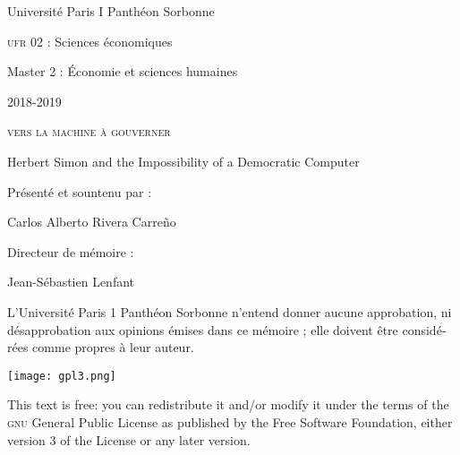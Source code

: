\documentclass[version=last,draft=false,paper=A4,portrait,twoside=true,twocolumn=false,headinclude=false,footinclude=false,fontsize=11,BCOR=15mm,DIV=calc,pagesize=auto,titlepage=firstiscover,mpinclude=true,open=right,chapterprefix=true,numbers=autoendperiod,headsepline=false,parskip=false]{scrreprt}
\author{Carlos Alberto Rivera Carreño}
\date{}
\title{}
\begin{document}
\begin{titlepage}
 \centering
\begin{french}
 {\large Université Paris I Panthéon Sorbonne \par}
 \vspace{0.5\baselineskip}
 {\large \textsc{ufr} 02 : Sciences économiques  \par}
 \vspace{0.5\baselineskip}
 {\large Master 2 : Économie et sciences humaines \par}
 \vspace{0.5\baselineskip}
 {\large 2018-2019 \par}
\end{french}
 \vspace{6\baselineskip}
 {\huge\sffamily \textsc{vers la machine à gouverner}  \par}
 {\Large\sffamily Herbert Simon and the Impossibility of a Democratic Computer \par}
\vfill
\begin{french}
 {\large Présenté et sountenu par : \par}
\end{french}
 {\large Carlos Alberto Rivera Carreño \par}
 \vspace{1\baselineskip}
\begin{french}
 {\large Directeur de mémoire : \par}
\end{french}
 {\large Jean-Sébastien Lenfant \par}
\end{titlepage}

\pagestyle{empty}

\begin{french}
L'Université Paris 1 Panthéon Sorbonne n'entend donner aucune approbation,
ni désapprobation aux opinions émises dans ce mémoire ; elle doivent être
considérées comme propres à leur auteur. 
\end{french}

\newpage
\vspace*{\fill}
\noindent
\texttt{[image: gpl3.png]}\par
\vspace{1\baselineskip}
This text is free: you can redistribute it and/or modify it
under the terms of the \textsc{gnu} General Public License as published by
the Free Software Foundation, either version 3 of the License or any later
version.
\end{document}
